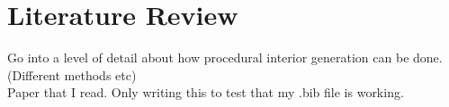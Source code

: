 \section{Literature Review}

Go into a level of detail about how procedural interior generation can be done. (Different methods etc)
\\
Paper that I read. Only writing this to test that my .bib file is working. \cite{real-time}